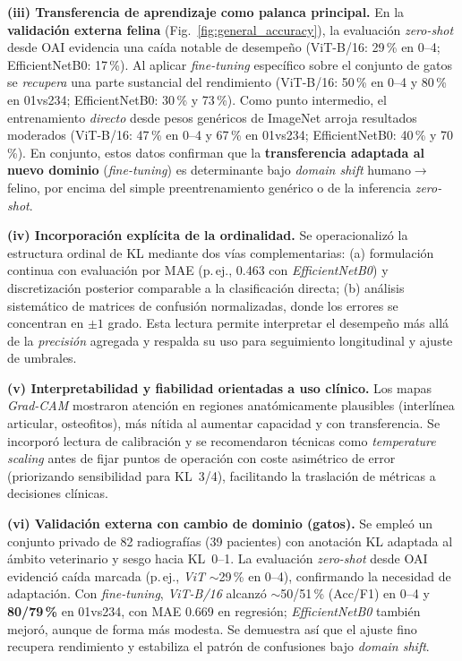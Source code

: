 \documentclass[11pt,spanish,listoffigures,listoftables]{tfgetsinf}
\begin{document}
\noindent\textbf{(iii) Transferencia de aprendizaje como palanca principal.}
En la \textbf{validación externa felina} (Fig.~\ref{fig:general_accuracy}), la evaluación \emph{zero-shot} desde OAI evidencia una caída notable de desempeño (ViT-B/16: 29\,\% en 0--4; EfficientNetB0: 17\,\%). Al aplicar \emph{fine-tuning} específico sobre el conjunto de gatos se \emph{recupera} una parte sustancial del rendimiento (ViT-B/16: 50\,\% en 0--4 y 80\,\% en 01vs234; EfficientNetB0: 30\,\% y 73\,\%). Como punto intermedio, el entrenamiento \emph{directo} desde pesos genéricos de ImageNet arroja resultados moderados (ViT-B/16: 47\,\% en 0--4 y 67\,\% en 01vs234; EfficientNetB0: 40\,\% y 70\,\%). En conjunto, estos datos confirman que la \textbf{transferencia adaptada al nuevo dominio} (\emph{fine-tuning}) es determinante bajo \emph{domain shift} humano$\rightarrow$felino, por encima del simple preentrenamiento genérico o de la inferencia \emph{zero-shot}.

\noindent\textbf{(iv) Incorporación explícita de la ordinalidad.}
Se operacionalizó la estructura ordinal de KL mediante dos vías complementarias: (a) formulación continua con evaluación por MAE (p.\,ej., 0.463 con \emph{EfficientNetB0}) y discretización posterior comparable a la clasificación directa; (b) análisis sistemático de matrices de confusión normalizadas, donde los errores se concentran en $\pm 1$ grado. Esta lectura permite interpretar el desempeño más allá de la \emph{precisión} agregada y respalda su uso para seguimiento longitudinal y ajuste de umbrales.

\noindent\textbf{(v) Interpretabilidad y fiabilidad orientadas a uso clínico.}
Los mapas \emph{Grad-CAM} mostraron atención en regiones anatómicamente plausibles (interlínea articular, osteofitos), más nítida al aumentar capacidad y con transferencia. Se incorporó lectura de calibración y se recomendaron técnicas como \emph{temperature scaling} antes de fijar puntos de operación con coste asimétrico de error (priorizando sensibilidad para KL~3/4), facilitando la traslación de métricas a decisiones clínicas.

\noindent\textbf{(vi) Validación externa con cambio de dominio (gatos).}
Se empleó un conjunto privado de 82 radiografías (39 pacientes) con anotación KL adaptada al ámbito veterinario y sesgo hacia KL~0--1. La evaluación \emph{zero-shot} desde OAI evidenció caída marcada (p.\,ej., \emph{ViT} $\sim$29\,\% en 0--4), confirmando la necesidad de adaptación. Con \emph{fine-tuning}, \emph{ViT-B/16} alcanzó $\sim$50/51\,\% (Acc/F1) en 0--4 y \textbf{80/79\,\%} en 01vs234, con MAE 0.669 en regresión; \emph{EfficientNetB0} también mejoró, aunque de forma más modesta. Se demuestra así que el ajuste fino recupera rendimiento y estabiliza el patrón de confusiones bajo \emph{domain shift}.
\end{document}
